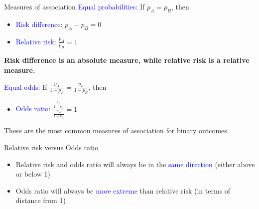 \documentclass[10pt,t]{beamer}
\begin{document}
\begin{frame}{Measures of association}
\textcolor{blue}{Equal probabilities}: If $p_A = p_B$, then
\medskip

	\begin{itemize}
		\item \textcolor{blue}{Risk difference}: $p_A - p_B = 0$
		\medskip
		
		\item \textcolor{blue}{Relative risk}: $\frac{p_A}{p_B} = 1$
	\end{itemize}  
\bigskip

\textbf{Risk difference is an absolute measure, while relative risk is a relative measure.}

\bigskip

\textcolor{blue}{Equal odds}: If $\frac{p_A}{1-p_A} = \frac{p_B}{1-p_B}$, then
\medskip 
	\begin{itemize}
		\item \textcolor{blue}{Odds ratio}: $\frac{\frac{p_A}{1-p_A}}{\frac{p_B}{1-p_B}}=1$ 
	\end{itemize}
\bigskip

These are the most common measures of association for binary outcomes. 
\end{frame}

\begin{frame}{Relative risk versus Odds ratio}
	\begin{itemize}
		\item Relative risk and odds ratio will always be in the \textcolor{blue}{same direction} (either above or below 1)
		\medskip
		\item Odds ratio will always be \textcolor{blue}{more extreme} than relative risk (in terms of distance from 1)
	\end{itemize}
\end{frame}
\end{document}
